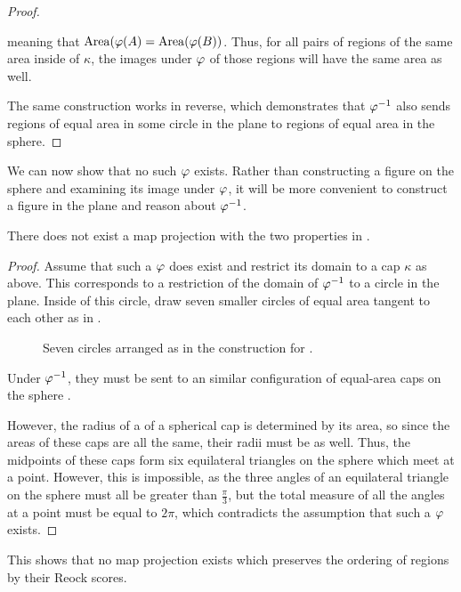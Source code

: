 \begin{proof}
{  }

  meaning that $\mathrm{Area}(\varphi(A) = \mathrm{Area}(\varphi(B))$. 
  Thus, for all pairs of regions of the same area inside of $\kappa$,
  the images under $\varphi$ of those regions will have the same area as
  well.

  The same construction works in reverse, which demonstrates that
  $\varphi^{-1}$ also sends regions of equal area in some circle in the
  plane to regions of  equal area in the sphere.
\end{proof} 

We can now show that no such $\varphi$ exists.  Rather than constructing a figure on the sphere and examining its image under $\varphi$, it will be more convenient to construct a figure in the plane and reason about $\varphi^{-1}$.

\begin{theorem}\label{thm:reockbad}
  There does not exist a map projection with the two properties in
  .  
\end{theorem}
\begin{proof}

  Assume that such a $\varphi$ does exist and restrict its domain to
  a cap $\kappa$ as above.  This corresponds to a restriction of the
  domain of $\varphi^{-1}$ to a circle in the plane.  Inside of this
  circle, draw seven smaller circles of equal area tangent to each
  other as in .

  \begin{figure}[!htb]
    \label{fig:sevencircles}
    \centering
    
    \caption{Seven circles arranged as in the construction for .}
  \end{figure}	

  Under $\varphi^{-1}$, they must be sent to an similar configuration 
  of equal-area caps on the sphere .  

  However, the radius of a
  of a spherical cap is determined by its area, so since the areas of
  these caps are all the same, their radii must be as well. Thus, 
  the midpoints of these caps form six equilateral triangles on the sphere
  which meet at a point.  However, this is impossible, as the three 
  angles of an equilateral triangle on the sphere must all be greater
  than $\tfrac{\pi}{3}$, but the total measure of all the angles at
  a point must be equal to
  $2\pi$, which contradicts the assumption that such a $\varphi$ exists.
\end{proof}

This shows that no map projection exists which preserves the ordering of regions by their Reock scores.

